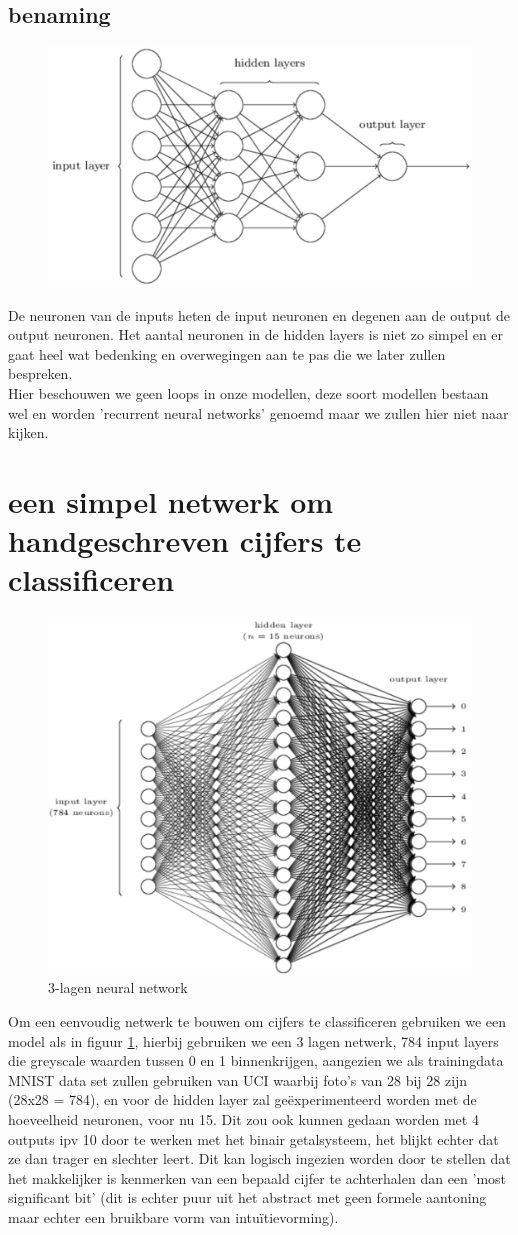 \documentclass[10pt,a4paper,twoside]{article}
\begin{document}
\subsection{benaming}
\begin{figure}[H]
	\centering
	\includegraphics[width=0.5\linewidth]{benaming.png}
\end{figure}
De neuronen van de inputs heten de input neuronen en degenen aan de output de output neuronen. Het aantal neuronen in de hidden layers is niet zo simpel en er gaat heel wat bedenking en overwegingen aan te pas die we later zullen bespreken.\\
Hier beschouwen we geen loops in onze modellen, deze soort modellen bestaan wel en worden 'recurrent neural networks' genoemd maar we zullen hier niet naar kijken.
\newpage
\section{een simpel netwerk om handgeschreven cijfers te classificeren}
\begin{figure}[h!]
	\centering
	\includegraphics[width=0.5\linewidth]{netwerk}
	\caption{3-lagen neural network}
	\label{netwerk}
\end{figure}
Om een eenvoudig netwerk te bouwen om cijfers te classificeren gebruiken we een model als in figuur \ref{netwerk}, hierbij gebruiken we een 3 lagen netwerk, 784 input layers die greyscale waarden tussen 0 en 1 binnenkrijgen, aangezien we als trainingdata MNIST data set zullen gebruiken van UCI waarbij foto's van 28 bij 28 zijn (28x28 = 784), en voor de hidden layer zal geëxperimenteerd worden met de hoeveelheid neuronen, voor nu 15. Dit zou ook kunnen gedaan worden met 4 outputs ipv 10 door te werken met het binair getalsysteem, het blijkt echter dat ze dan trager en slechter leert. Dit kan logisch ingezien worden door te stellen dat het makkelijker is kenmerken van een bepaald cijfer te achterhalen dan een 'most significant bit'  (dit is echter puur uit het abstract met geen formele aantoning maar echter een bruikbare vorm van intuïtievorming).
\end{document}
